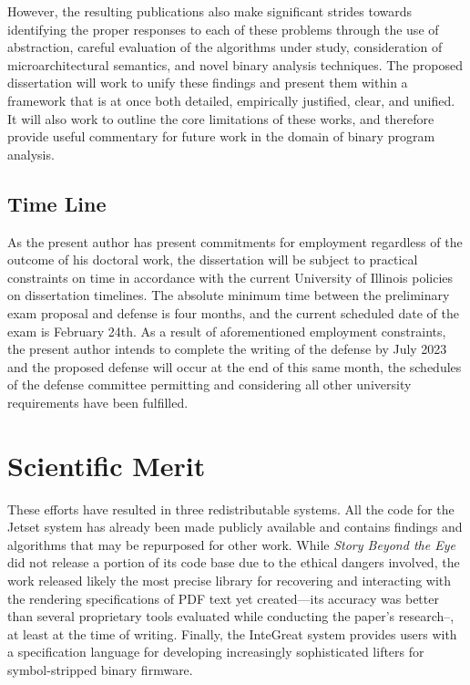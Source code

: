 However, the resulting publications also make significant strides towards identifying the proper responses to each of these problems through the use of abstraction, careful evaluation of the algorithms under study, consideration of microarchitectural semantics, and novel binary analysis techniques.
The proposed dissertation will work to unify these findings and present them within a framework that is at once both detailed, empirically justified, clear, and unified.
It will also work to outline the core limitations of these works, and therefore provide useful commentary for future work in the domain of binary program analysis.

\subsection{Time Line}

As the present author has present commitments for employment regardless of the outcome of his doctoral work, the dissertation will be subject to practical constraints on time in accordance with the current University of Illinois policies on dissertation timelines.
The absolute minimum time between the preliminary exam proposal and defense is four months, and the current scheduled date of the exam is February 24th.
As a result of aforementioned employment constraints, the present author intends to complete the writing of the defense by July 2023 and the proposed defense will occur at the end of this same month, the schedules of the defense committee permitting and considering all other university requirements have been fulfilled.

\section{Scientific Merit}

These efforts have resulted in three redistributable systems.
All the code for the Jetset system has already been made publicly available and contains findings and algorithms that may be repurposed for other work.
While \emph{Story Beyond the Eye} did not release a portion of its code base due to the ethical dangers involved, the work released likely the most precise library for recovering and interacting with the rendering specifications of PDF text yet created---its accuracy was better than several proprietary tools evaluated while conducting the paper's research--, at least at the time of writing.
Finally, the InteGreat system provides users with a specification language for developing increasingly sophisticated lifters for symbol-stripped binary firmware.

